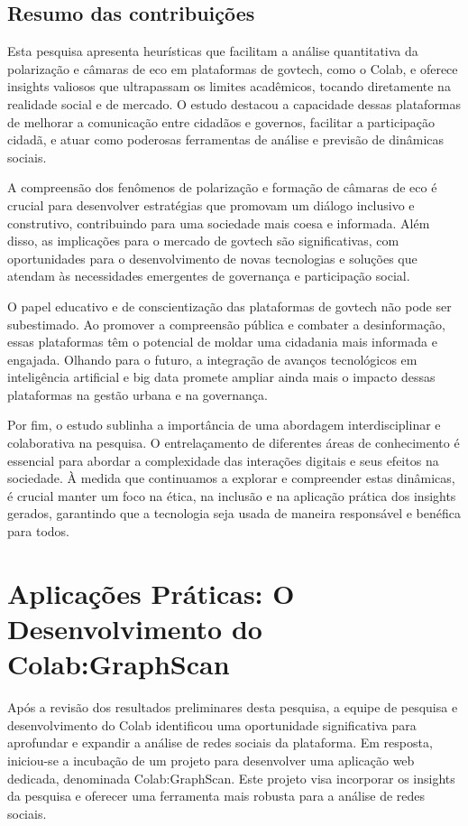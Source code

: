 \subsection*{Resumo das contribuições}

Esta pesquisa apresenta heurísticas que facilitam a análise quantitativa da polarização e câmaras de eco em plataformas de govtech, como o Colab, e oferece insights valiosos que ultrapassam os limites acadêmicos, tocando diretamente na realidade social e de mercado. O estudo destacou a capacidade dessas plataformas de melhorar a comunicação entre cidadãos e governos, facilitar a participação cidadã, e atuar como poderosas ferramentas de análise e previsão de dinâmicas sociais.

A compreensão dos fenômenos de polarização e formação de câmaras de eco é crucial para desenvolver estratégias que promovam um diálogo inclusivo e construtivo, contribuindo para uma sociedade mais coesa e informada. Além disso, as implicações para o mercado de govtech são significativas, com oportunidades para o desenvolvimento de novas tecnologias e soluções que atendam às necessidades emergentes de governança e participação social.

O papel educativo e de conscientização das plataformas de govtech não pode ser subestimado. Ao promover a compreensão pública e combater a desinformação, essas plataformas têm o potencial de moldar uma cidadania mais informada e engajada. Olhando para o futuro, a integração de avanços tecnológicos em inteligência artificial e big data promete ampliar ainda mais o impacto dessas plataformas na gestão urbana e na governança.

Por fim, o estudo sublinha a importância de uma abordagem interdisciplinar e colaborativa na pesquisa. O entrelaçamento de diferentes áreas de conhecimento é essencial para abordar a complexidade das interações digitais e seus efeitos na sociedade. À medida que continuamos a explorar e compreender estas dinâmicas, é crucial manter um foco na ética, na inclusão e na aplicação prática dos insights gerados, garantindo que a tecnologia seja usada de maneira responsável e benéfica para todos.

\section{Aplicações Práticas: O Desenvolvimento do Colab:GraphScan}

Após a revisão dos resultados preliminares desta pesquisa, a equipe de pesquisa e desenvolvimento do Colab identificou uma oportunidade significativa para aprofundar e expandir a análise de redes sociais da plataforma. Em resposta, iniciou-se a incubação de um projeto para desenvolver uma aplicação web dedicada, denominada Colab:GraphScan. Este projeto visa incorporar os insights da pesquisa e oferecer uma ferramenta mais robusta para a análise de redes sociais.

